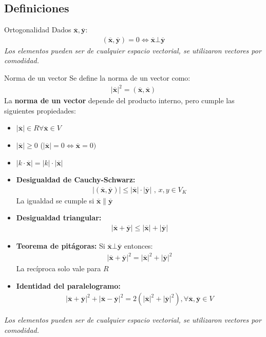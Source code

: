 \documentclass[a4paper, twoside]{article}
\numberwithin{equation}{section}
\numberwithin{figure}{section}
\numberwithin{table}{section}
\newcommand{\vect}[1]{\overline{\textbf{#1}}}
\newcommand{\dete}[1]{\left\vert #1 \right\vert}
\newcommand{\produ}[1]{(#1)}
\begin{document}
\subsection{Definiciones}
\begin{definicion*}{Ortogonalidad}
	Dados $\vect{x},\vect{y}$:
	\begin{align}
		\produ{\vect{x},\vect{y}}=0 \Longleftrightarrow \vect{x} \bot \vect{y}
	\end{align}
	\emph{Los elementos pueden ser de cualquier espacio vectorial, se utilizaron vectores por comodidad.}
\end{definicion*}

\begin{definicion*}{Norma de un vector}
	Se define la norma de un vector como:
	\begin{align}
		\dete{\vect{x}}^2=\produ{\vect{x},\vect{x}}
	\end{align}
	La \textbf{norma de un vector} depende del producto interno, pero cumple las siguientes propiedades:
	\begin{itemize}
		\item $\dete{\vect{x}} \in R \forall \vect{x} \in V$
		\item $\dete{\vect{x}} \geq 0$ ($\dete{\vect{x}}=0 \Longleftrightarrow \vect{x}=0)$
		\item $\dete{k \cdot \vect{x}}=\dete{k} \cdot \dete{\vect{x}}$
		\item \textbf{Desigualdad de Cauchy-Schwarz:} 
			\begin{align}
				\dete{\produ{\vect{x},\vect{y}}} \leq \dete{\vect{x}} \cdot \dete{\vect{y}} \text{ , } x,y \in V_K
			\end{align}
			La igualdad se cumple si $\vect{x} \parallel \vect{y}$
		\item \textbf{Desigualdad triangular:}
			\begin{align}
				\dete{\vect{x}+\vect{y}} \leq \dete{\vect{x}}+\dete{\vect{y}}
			\end{align}
		\item \textbf{Teorema de pitágoras:} Si $\vect{x} \bot \vect{y}$ entonces:
			\begin{align}
				\dete{\vect{x}+\vect{y}}^2=\dete{\vect{x}}^2+\dete{\vect{y}}^2
			\end{align}
			La recíproca solo vale para $R$
		\item \textbf{Identidad del paralelogramo:}
			\begin{align}
				\dete{ \vect{x} + \vect{y} }^2 + \dete{ \vect{x} - \vect{y} }^2 = 2\left( \dete{ \vect{x} }^2 + \dete{ \vect{y} }^2 \right), \forall \vect{x}, \vect{y} \in V
			\end{align}
	\end{itemize}
	\emph{Los elementos pueden ser de cualquier espacio vectorial, se utilizaron vectores por comodidad.}
\end{definicion*}
\end{document}
